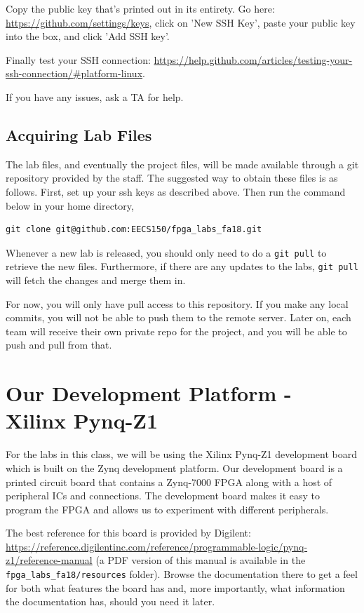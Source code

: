 \documentclass[11pt]{article}
\begin{document}
Copy the public key that's printed out in its entirety. Go here: \url{https://github.com/settings/keys}, click on 'New SSH Key', paste your public key into the box, and click 'Add SSH key'.

Finally test your SSH connection: \url{https://help.github.com/articles/testing-your-ssh-connection/#platform-linux}.

If you have any issues, ask a TA for help.

\subsection{Acquiring Lab Files}
The lab files, and eventually the project files, will be made available through a git repository provided by the staff. The suggested way to obtain these files is as follows. First, set up your ssh keys as described above. Then run the command below in your home directory,

\begin{verbatim}
git clone git@github.com:EECS150/fpga_labs_fa18.git
\end{verbatim}

Whenever a new lab is released, you should only need to do a \verb|git pull| to retrieve the new files. Furthermore, if there are any updates to the labs, \verb|git pull| will fetch the changes and merge them in.

For now, you will only have pull access to this repository. If you make any local commits, you will not be able to push them to the remote server. Later on, each team will receive their own private repo for the project, and you will be able to push and pull from that.

\section{Our Development Platform - Xilinx Pynq-Z1}
For the labs in this class, we will be using the Xilinx Pynq-Z1 development board which is built on the Zynq development platform. Our development board is a printed circuit board that contains a Zynq-7000 FPGA along with a host of peripheral ICs and connections. The development board makes it easy to program the FPGA and allows us to experiment with different peripherals.

The best reference for this board is provided by Digilent: \url{https://reference.digilentinc.com/reference/programmable-logic/pynq-z1/reference-manual} (a PDF version of this manual is available in the \verb|fpga_labs_fa18/resources| folder). Browse the documentation there to get a feel for both what features the board has and, more importantly, what information the documentation has, should you need it later.
\end{document}
